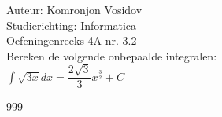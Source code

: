\documentclass[a4paper]{article}
\newcommand{\dint}{\displaystyle\int}
\begin{document}
	
	\noindent \large Auteur: Komronjon Vosidov \\
	\noindent \large Studierichting: Informatica\\
	\noindent \large Oefeningenreeks 4A nr. 3.2\\
	
	
	\medskip
	\normalsize
	Bereken de volgende onbepaalde integralen:\\
	
	$ \dint \sqrt{3x} dx = \dfrac{2 \sqrt{3}}{3} x^{\tfrac{3}{2}} + C $


\begin{thebibliography}{999}
\end{thebibliography}		
\end{document}
